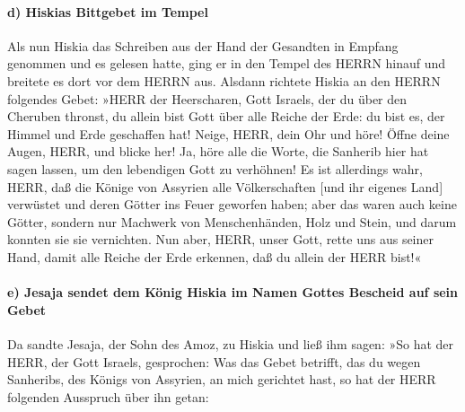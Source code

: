 \hypertarget{d-hiskias-bittgebet-im-tempel}{%
\paragraph{d) Hiskias Bittgebet im
Tempel}\label{d-hiskias-bittgebet-im-tempel}}

Als nun Hiskia das Schreiben aus der Hand der Gesandten
in Empfang genommen und es gelesen hatte, ging er in den Tempel des
HERRN hinauf und breitete es dort vor dem HERRN aus.
Alsdann richtete Hiskia an den HERRN folgendes Gebet:
»HERR der Heerscharen, Gott Israels, der du über den
Cheruben thronst, du allein bist Gott über alle Reiche der Erde: du bist
es, der Himmel und Erde geschaffen hat! Neige, HERR, dein
Ohr und höre! Öffne deine Augen, HERR, und blicke her! Ja, höre alle die
Worte, die Sanherib hier hat sagen lassen, um den lebendigen Gott zu
verhöhnen! Es ist allerdings wahr, HERR, daß die Könige
von Assyrien alle Völkerschaften {[}und ihr eigenes Land{]} verwüstet
und deren Götter ins Feuer geworfen haben; aber das waren
auch keine Götter, sondern nur Machwerk von Menschenhänden, Holz und
Stein, und darum konnten sie sie vernichten. Nun aber,
HERR, unser Gott, rette uns aus seiner Hand, damit alle Reiche der Erde
erkennen, daß du allein der HERR bist!«

\hypertarget{e-jesaja-sendet-dem-kuxf6nig-hiskia-im-namen-gottes-bescheid-auf-sein-gebet}{%
\paragraph{e) Jesaja sendet dem König Hiskia im Namen Gottes Bescheid
auf sein
Gebet}\label{e-jesaja-sendet-dem-kuxf6nig-hiskia-im-namen-gottes-bescheid-auf-sein-gebet}}

Da sandte Jesaja, der Sohn des Amoz, zu Hiskia und ließ
ihm sagen: »So hat der HERR, der Gott Israels, gesprochen: Was das Gebet
betrifft, das du wegen Sanheribs, des Königs von Assyrien, an mich
gerichtet hast, so hat der HERR folgenden Ausspruch über
ihn getan:

